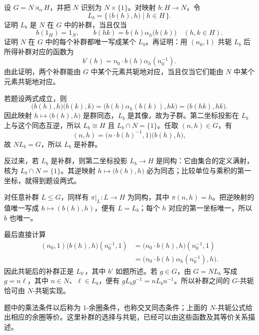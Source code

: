 \begin{exercise}\label{b1:ex:06-complement-cocycle}
	设 \(G=N\rtimes_\alpha H\)，并把 \(N\) 识别为 \(N\times\{1\}\)。对映射 \(b:H\rightarrow N\)，令
	\[
		L_b=\{\,\bigl(b(h),h\bigr)\mid h\in H\,\}.
	\]
	证明 \(L_b\) 是 \(N\) 在 \(G\) 中的补群，当且仅当
	\[
		b(1_H)=1_N,\qquad b(hk)=b(h)\alpha_h\bigl(b(k)\bigr) \quad(h,k\in H).
	\]
	证明 \(N\) 在 \(G\) 中的每个补群都唯一写成某个 \(L_b\)。再证明：用 \((n_0,1)\) 共轭 \(L_b\) 后所得补群对应的函数为
	\[
		b'(h)=n_0\cdot b(h)\alpha_h(n_0^{-1}).
	\]
	由此证明，两个补群能由 \(G\) 中某个元素共轭地对应，当且仅当它们能由 \(N\) 中某个元素共轭地对应。
\end{exercise}
\begin{solution}
	若题设两式成立，则
	\[
		\bigl(b(h),h\bigr)\bigl(b(k),k\bigr) =\bigl(b(h)\alpha_h(b(k)),hk\bigr) =\bigl(b(hk),hk\bigr).
	\]
	因此映射 \(h\mapsto\bigl(b(h),h\bigr)\) 是群同态，\(L_b\) 是其像，故为子群。第二坐标投影在 \(L_b\) 上与这个同态互逆，所以 \(L_b\cong H\) 且 \(L_b\cap N=\{1\}\)。任取 \((n,h)\in G\)，有
	\[
		(n,h)=\bigl(n\cdot b(h)^{-1},1\bigr)\bigl(b(h),h\bigr),
	\]
	故 \(NL_b=G\)，所以 \(L_b\) 是补群。

	反过来，若 \(L_b\) 是补群，则第二坐标投影 \(L_b\rightarrow H\) 是同构：它由集合的定义满射，核为 \(L_b\cap N=\{1\}\)。其逆映射 \(h\mapsto\bigl(b(h),h\bigr)\) 必为同态；比较单位与乘积的第一坐标，就得到题设两式。

	对任意补群 \(L\leq G\)，同样有 \(\pi|_L:L\rightarrow H\) 为同构，其中 \(\pi(n,h)=h\)。把逆映射的值唯一写成 \(h\mapsto(b(h),h)\)，便有 \(L=L_b\)；每个 \(h\) 对应的第一坐标唯一，所以 \(b\) 也唯一。

	最后直接计算
	\[
		\begin{aligned}
			(n_0,1)\bigl(b(h),h\bigr)(n_0^{-1},1) &=\bigl(n_0\cdot b(h),h\bigr)(n_0^{-1},1)\\
			&=\bigl(n_0\cdot b(h)\alpha_h(n_0^{-1}),h\bigr).
		\end{aligned}
	\]
	因此共轭后的补群正是 \(L_{b'}\)，其中 \(b'\) 如题所述。若 \(g\in G\)，由 \(G=NL_b\) 写成 \(g=n\ell\)，其中 \(n\in N\)、\(\ell\in L_b\)，便有 \(gL_bg^{-1}=nL_bn^{-1}\)。所以补群之间的 \(G\)-共轭恰可由 \(N\)-共轭实现。

	题中的乘法条件以后称为 \(1\)-余圈条件，也称交叉同态条件；上面的 \(N\)-共轭公式给出相应的余圈等价。这里补群的选择与共轭，已经可以由这些函数及其等价关系描述。
\end{solution}

